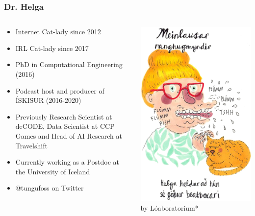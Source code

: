 \begin{frame}
    \frametitle{Dr. Helga}
    \begin{columns}[T]
        \begin{column}{0.55\textwidth}
            \begin{itemize}
                \item Internet Cat-lady since 2012
                \item IRL Cat-lady since 2017
                \item PhD in Computational Engineering (2016)
                \item Podcast host and producer of \'{I}SKISUR (2016-2020)
                \item Previously Research Scientist at deCODE, Data Scientist at CCP Games
                and Head of AI Research at Travelshift
                \item Currently working as a Postdoc at the University of Iceland
                \item @tungufoss on Twitter
            \end{itemize}
        \end{column}
        \begin{column}{0.4\textwidth}
            \centering
            \includegraphics[width=.9\textwidth]{../figures/helga}
            by L\'{o}aborator\'{i}um*


\end{column}
\end{columns}
\end{frame}
